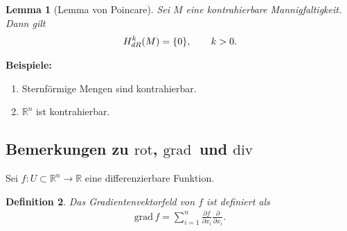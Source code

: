 \documentclass[12pt,a4paper]{article}
\def\R{\mathbb{R}}
\def\grad{\mathrm{grad}\,}
\newtheorem{Lemma}{Lemma}[section]
\newtheorem{Definition}[Lemma]{Definition}
\begin{document}
\bigskip

\begin{Lemma}[Lemma von Poincare]
Sei $M$ eine kontrahierbare Mannigfaltigkeit. Dann gilt
\begin{align*}
H_{dR}^k(M) = \{0\},\qquad k > 0.
\end{align*}
\end{Lemma}


\bigskip

{\bf Beispiele:}
\begin{enumerate}
  \item Sternf\"ormige Mengen sind kontrahierbar.
  \item $\R^n$ ist kontrahierbar.
\end{enumerate}

\newcommand{\rot}{\mathrm{rot}}
\renewcommand{\div}{\mathrm{div}}

\subsection{Bemerkungen zu $\rot$, $\grad$ und $\div$}

Sei $f: U\subset\R ^n\to \R$ eine differenzierbare Funktion.

\begin{Definition}
Das \emph{Gradientenvektorfeld} von $f$ ist definiert als
\begin{align*}
\grad f = \sum_{i=1}^n \frac{\partial f}{\partial x_i}\frac{\partial}{\partial
x_i}.
\end{align*}
\end{Definition}

\bigskip
\end{document}
